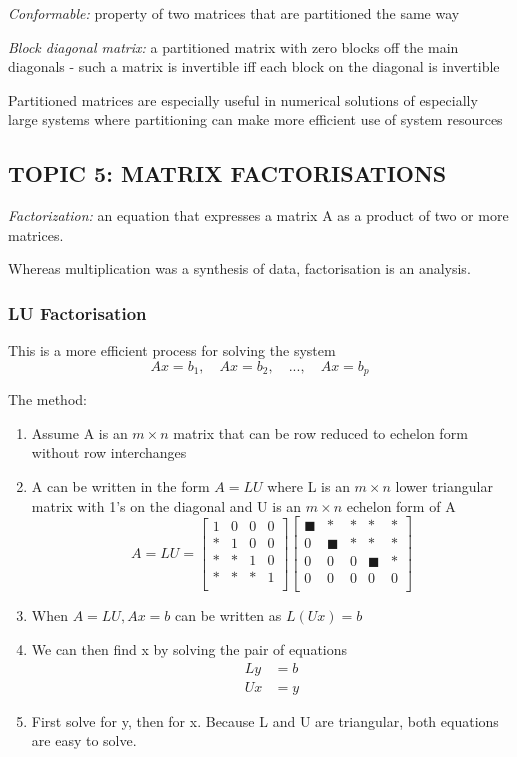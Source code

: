 \documentclass[12pt]{article} %
\begin{document}
\emph{Conformable:} property of two matrices that are partitioned the same way

\emph{Block diagonal matrix:} a partitioned matrix with zero blocks off the main diagonals 
\quad - such a matrix is invertible iff each block on the diagonal is invertible

Partitioned matrices are especially useful in numerical solutions of especially large systems where partitioning can make more efficient use of system resources


\subsection{TOPIC 5: MATRIX FACTORISATIONS}
\emph{Factorization:} an equation that expresses a matrix A as a product of two or more matrices. 

Whereas multiplication was a synthesis of data, factorisation is an analysis.

\subsubsection{LU Factorisation}
This is a more efficient process for solving the system
$$Ax = b_1, \quad Ax= b_2, \quad ..., \quad Ax = b_p$$

The method:
\begin{enumerate}
	\item Assume A is an $m \times n$ matrix that can be row reduced to echelon form without row interchanges
	\item A can be written in the form $A = LU$ where L is an $m \times n$ lower triangular matrix with 1's on the diagonal and U is an $m \times n$ echelon form of A
	$$A = LU = \begin{bmatrix}
		1 & 0 & 0 & 0\\
		* & 1 & 0 & 0\\
		* & * & 1 & 0\\
		* & * & * & 1\\
	\end{bmatrix} \begin{bmatrix}
		\blacksquare & * & * & * & *\\
		0 & \blacksquare & * & * & *\\
		0 & 0 & 0 & \blacksquare & *\\
		0 & 0 & 0 & 0 & 0\\
	\end{bmatrix}$$
	\item When $A = LU, Ax = b$ can be written as $L(Ux) = b$
	\item We can then find x by solving the pair of equations
		\begin{align*}
			Ly &= b\\
			Ux &= y
		\end{align*}
	\item First solve for y, then for x. Because L and U are triangular, both equations are easy to solve. 
\end{enumerate}
\end{document}

